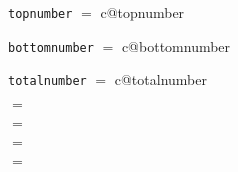 ﻿\documentclass[a4j,11pt,papersize]{jsarticle}
\begin{document}
\newcommand*\checkcnt[1]{\texttt{#1} $=$ 
   \expandafter\the\csname c@#1\endcsname} 
\checkcnt{topnumber}\par
\checkcnt{bottomnumber}\par
\checkcnt{totalnumber}\par
\newcommand*\checkcmd[1]{\texttt{\string#1} $=$ #1}
\checkcmd{\topfraction}\par
\checkcmd{\bottomfraction}\par
\checkcmd{\textfraction}\par
\checkcmd{\floatpagefraction}

\renewcommand\topfraction{0.85}
\addtocounter{topnumber}{2}
\end{document}
